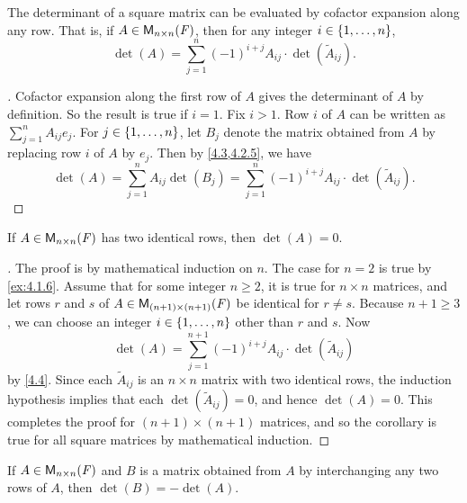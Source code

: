 \begin{thm}\label{4.4}
  The determinant of a square matrix can be evaluated by cofactor expansion along any row.
  That is, if \(A \in \mathsf{M}_{{n} \times n}({\mathit{F}})\), then for any integer \(i \in \left\lbrace1, \dots, n\right\rbrace\),
  \[
    \det(A) = \sum_{j = 1}^n (-1)^{i + j} A_{i j} \cdot \det(\tilde{A}_{i j}).
  \]
\end{thm}

\begin{proof}[]
  Cofactor expansion along the first row of \(A\) gives the determinant of \(A\) by definition.
  So the result is true if \(i = 1\).
  Fix \(i > 1\).
  Row \(i\) of \(A\) can be written as \(\sum_{j = 1}^n A_{i j} e_j\).
  For \(j \in \left\lbrace1, \dots, n\right\rbrace\), let \(B_j\) denote the matrix obtained from \(A\) by replacing row \(i\) of \(A\) by \(e_j\).
  Then by \cref{4.3,4.2.5}, we have
  \[
    \det(A) = \sum_{j = 1}^n A_{i j} \det(B_j) = \sum_{j = 1}^n (-1)^{i + j} A_{i j} \cdot \det(\tilde{A}_{i j}).
  \]
\end{proof}

\begin{cor}\label{4.2.6}
  If \(A \in \mathsf{M}_{{n} \times n}({\mathit{F}})\) has two identical rows, then \(\det(A) = 0\).
\end{cor}

\begin{proof}[]
  The proof is by mathematical induction on \(n\).
  The case for \(n = 2\) is true by \cref{ex:4.1.6}.
  Assume that for some integer \(n \geq 2\), it is true for \(n \times n\) matrices, and let rows \(r\) and \(s\) of \(A \in \mathsf{M}_{{(n + 1)} \times (n + 1)}({\mathit{F}})\) be identical for \(r \neq s\).
  Because \(n + 1 \geq 3\), we can choose an integer \(i \in \left\lbrace1, \dots, n\right\rbrace\) other than \(r\) and \(s\).
  Now
  \[
    \det(A) = \sum_{j = 1}^{n + 1} (-1)^{i + j} A_{i j} \cdot \det(\tilde{A}_{i j})
  \]
  by \cref{4.4}.
  Since each \(\tilde{A}_{i j}\) is an \(n \times n\) matrix with two identical rows, the induction hypothesis implies that each \(\det(\tilde{A}_{i j}) = 0\), and hence \(\det(A) = 0\).
  This completes the proof for \((n + 1) \times (n + 1)\) matrices, and so the corollary is true for all square matrices by mathematical induction.
\end{proof}

\begin{thm}\label{4.5}
  If \(A \in \mathsf{M}_{{n} \times n}({\mathit{F}})\) and \(B\) is a matrix obtained from \(A\) by interchanging any two rows of \(A\), then \(\det(B) = -\det(A)\).
\end{thm}

